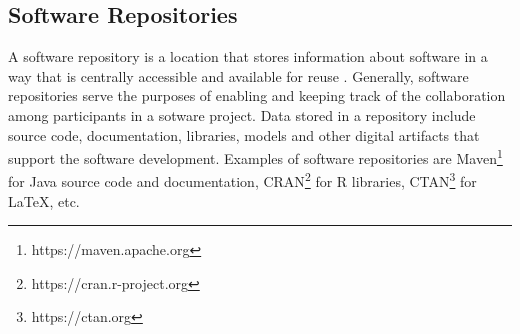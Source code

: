 %
%



\subsection{Software Repositories}


A software repository is a location that stores information about software \citep{oinas1999two,yamada2015classification} in a way that is centrally accessible and available for reuse \citep{DBLP:conf/sigsoft/MarcusM10}. Generally, software repositories serve the purposes of enabling \citep{DBLP:conf/itqm/SrinivasRR14} and keeping track of the collaboration among participants in a sotware project. Data stored in a repository include source code, documentation, libraries, models and other digital artifacts \citep{li2010measurement,DBLP:journals/infsof/SunLLLL15} that support the software development. Examples of software repositories are Maven\footnote{https://maven.apache.org} for Java source code and documentation, CRAN\footnote{https://cran.r-project.org} for R libraries, CTAN\footnote{https://ctan.org} for LaTeX, etc. 

